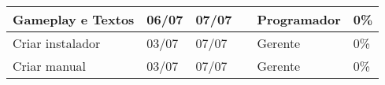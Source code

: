 \documentclass[a4paper, 11pt]{article} %
\begin{document}
\begin{table}[h]
\begin{tabular}{|l|l|l|l|l|l|}
Gameplay e Textos                            & 06/07                                & 07/07                             &                                         & Programador                               & 0\%                                     \\ \hline
Criar instalador                             & 03/07                                & 07/07                             &                                         & Gerente                                   & 0\%                                     \\ \hline
Criar manual                                 & 03/07                                & 07/07                             &                                         & Gerente                                   & 0\%                                     \\ \hline
\end{tabular}
\end{table}
\end{document}
